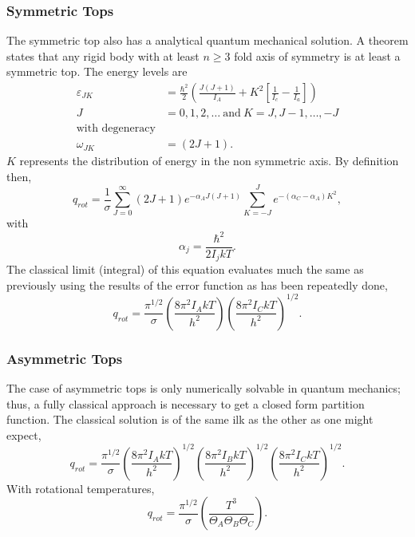 \subsubsection{Symmetric Tops}
The symmetric top also has a analytical quantum mechanical solution. A theorem
states that any rigid body with at least $n \ge 3$ fold axis of symmetry is at
least a symmetric top. The energy levels are
\begin{align*}
	\varepsilon_{JK} &= \frac{\hbar^2}{2}
	{\left( \frac{J(J+1)}{I_A} + K^2
	{\left[\frac{1}{I_c} - \frac{1}{I_{a}}\right]}
	\right)}\\
	J &= 0,1,2,\ldots
	~ \text{and} ~ K = J, J-1, \ldots, -J\\
	\text{with degeneracy}\\
	\omega_{JK} &= (2J+1).
\end{align*}
$K$ represents the distribution of energy in the non symmetric axis. By
definition then,
\begin{equation*}
	q_{rot} = \frac{1}{\sigma}
	\sum_{J=0}^{\infty}{(2J+1) e^{-\alpha_A J(J+1)}}
	\sum_{K=-J}^{J}{e^{-(\alpha_C - \alpha_{A})K^2}},
\end{equation*}
with
\begin{equation*}
	\alpha_j = \frac{\hbar^2}{2I_j kT}.
\end{equation*}
The classical limit (integral) of this equation evaluates much the same as
previously using the results of the error function as has been repeatedly done,
\begin{equation*}
	q_{rot} = \frac{\pi^{1/2}}{\sigma}
	{\left(\frac{8\pi^2 I_A kT}{h^2}\right)}
	{\left(\frac{8\pi^2 I_C kT}{h^2}\right)}^{1/2}.
\end{equation*}
\subsubsection{Asymmetric Tops}
The case of asymmetric tops is only numerically solvable in quantum mechanics;
thus, a fully classical approach is necessary to get a closed form partition
function. The classical solution is of the same ilk as the other as one
might expect,
\begin{equation*}
	q_{rot} = \frac{\pi^{1/2}}{\sigma}
	{\left(\frac{8\pi^2 I_A kT}{h^2}\right)}^{1/2}
	{\left(\frac{8\pi^2 I_B kT}{h^2}\right)}^{1/2}
	{\left(\frac{8\pi^2 I_C kT}{h^2}\right)}^{1/2}.
\end{equation*}
With rotational temperatures,
\begin{equation*}
	q_{rot} = \frac{\pi^{1/2}}{\sigma}
	{\left(\frac{T^3}{\Theta_A \Theta_B \Theta_{C}}\right)}.
\end{equation*}

